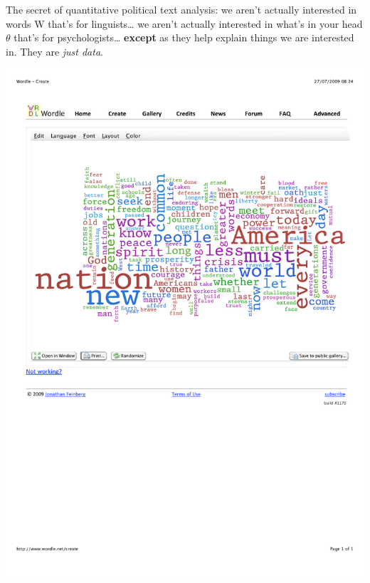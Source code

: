 \documentclass{mediumfoils}
\begin{document}
The secret of quantitative political text analysis:
\ita
\itm we aren't actually interested in words W
\ita
\itm that's for linguists\ldots
\itz
\itm we aren't actually interested in what's in your head $\theta$
\ita
\itm that's for psychologists\ldots
\itz
\itm 
\itm \textbf{except} as they help explain things we are interested in.  They are \textit{just data}.
\itz  


%
%
%

\begin{center}
\includegraphics[scale=1.2]{pictures/obamawordle}
\end{center}
\end{document}
